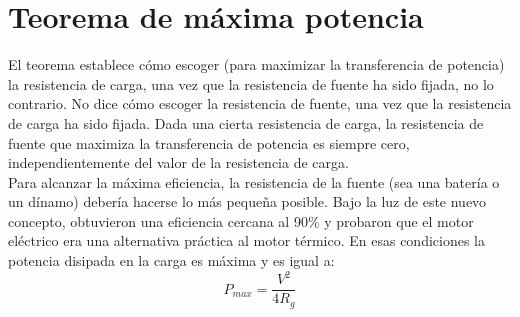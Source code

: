 \documentclass[a4paper,12pt]{report}
\begin{document}
\chapter{Teorema de máxima potencia}
El teorema establece cómo escoger (para maximizar la transferencia de potencia) la resistencia de carga, una vez que la resistencia de fuente ha sido fijada, no lo contrario. No dice cómo escoger la resistencia de fuente, una vez que la resistencia de carga ha sido fijada. Dada una cierta resistencia de carga, la resistencia de fuente que maximiza la transferencia de potencia es siempre cero, independientemente del valor de la resistencia de carga.\\
Para alcanzar la máxima eficiencia, la resistencia de la fuente (sea una batería o un dínamo) debería hacerse lo más pequeña posible. Bajo la luz de este nuevo concepto, obtuvieron una eficiencia cercana al 90\% y probaron que el motor eléctrico era una alternativa práctica al motor térmico. En esas condiciones la potencia disipada en la carga es máxima y es igual a: 
$$
P_{max} = \frac{V^{2}}{4R_{g}}
$$
\end{document}
